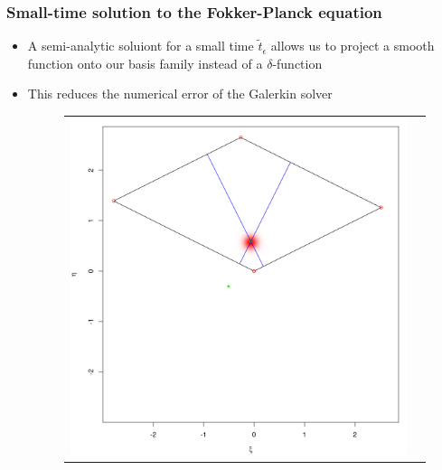 \documentclass{beamer}
\begin{document}
\begin{frame}
  \frametitle{Small-time solution to the Fokker-Planck equation}
  \begin{itemize}
  \item A semi-analytic soluiont for a small time $\tilde{t}_\epsilon$ allows us to project a smooth function onto our basis family instead of a $\delta$-function
  \item This reduces the numerical error of the Galerkin solver
    \begin{figure}
      \centering
      \begin{tabular}{cc}
        \begin{minipage}{0.3\textwidth}
          \centering
          \includegraphics[width=1\linewidth]{../small-time-solution.png}
        \end{minipage}
        & \begin{minipage}{0.3\textwidth}
          \centering

\end{minipage}
\end{tabular}
\end{figure}
\end{itemize}
\end{frame}
\end{document}
